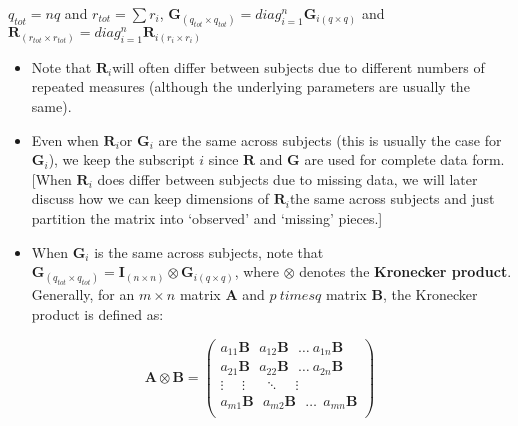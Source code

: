 \documentclass[
  9pt,
  ignorenonframetext,
]{beamer}
\begin{document}
\begin{frame}{}
\(q_{tot} = nq\) and \(r_{tot} = \sum r_i\),
\(\pmb G_{(q_{tot} \times q_{tot})} = diag_{i=1}^n \pmb G_{i (q \times q)}\)
and
\(\pmb R_{(r_{tot} \times r_{tot})} = diag_{i=1}^n \pmb R_{i (r_i \times r_i)}\)
\end{frame}

\begin{frame}{}
\protect\hypertarget{section-3}{}
\begin{itemize}
\item
  Note that \(\pmb R_i\)will often differ between subjects due to
  different numbers of repeated measures (although the underlying
  parameters are usually the same).
\item
  Even when \(\pmb R_i\)or \(\pmb G_i\) are the same across subjects
  (this is usually the case for \(\pmb G_i\)), we keep the subscript
  \(i\) since \(\pmb R\) and \(\pmb G\) are used for complete data form.
  {[}When \(\pmb R_i\) does differ between subjects due to missing data,
  we will later discuss how we can keep dimensions of \(\pmb R_i\)the
  same across subjects and just partition the matrix into `observed' and
  `missing' pieces.{]}
\item
  When \(\pmb G_i\) is the same across subjects, note that
  \(\pmb G_{(q_{tot} \times q_{tot})} = \pmb I_{(n\times n)} \otimes \pmb G_{i(q \times q)}\),
  where \(\otimes\) denotes the \textbf{Kronecker product}. Generally,
  for an \(m \times n\) matrix \(\pmb A\) and \(p \ times q\) matrix
  \(\pmb B\), the Kronecker product is defined as:
\end{itemize}

\[
\pmb  A \otimes \pmb B = 
\begin{pmatrix}
a_{11} \pmb B\ \ \ a_{12} \pmb B\  \ \ \dots\ a_{1n} \pmb B\\ a_{21} \pmb B\ \ \ a_{22} \pmb B\ \ \ \dots\ a_{2n} \pmb B\\ \vdots\ \ \ \ \ \ \vdots\ \ \ \ \ \ \ddots\ \ \ \ \  \vdots\\ a_{m1} \pmb B\ \ \  a_{m2} \pmb B\ \ \  \dots\ \ a_{mn} \pmb B\\ \end{pmatrix}
\]
\end{frame}
\end{document}
